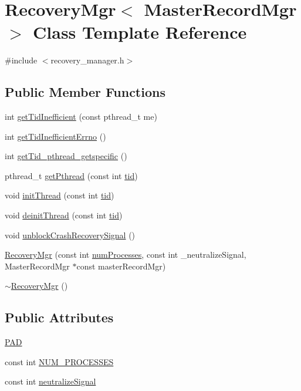 \hypertarget{classRecoveryMgr}{}\section{Recovery\+Mgr$<$ Master\+Record\+Mgr $>$ Class Template Reference}
\label{classRecoveryMgr}


{\ttfamily \#include $<$recovery\+\_\+manager.\+h$>$}

\subsection*{Public Member Functions}
\begin{DoxyCompactItemize}
\item 
int \hyperlink{classRecoveryMgr_a66bc99f5748e8418e9f111416d44dcac}{get\+Tid\+Inefficient} (const pthread\+\_\+t me)
\item 
int \hyperlink{classRecoveryMgr_a5917bf180cc6917ebb903a218d163aef}{get\+Tid\+Inefficient\+Errno} ()
\item 
int \hyperlink{classRecoveryMgr_a6c6f9170e844cb0a600b10ebf3ea6e37}{get\+Tid\+\_\+pthread\+\_\+getspecific} ()
\item 
pthread\+\_\+t \hyperlink{classRecoveryMgr_a9f8a5b27b63e5d1c51c31f7bdec75242}{get\+Pthread} (const int \hyperlink{microbench_2main_8cpp_a9ca9869868fe7e7a38a921cc7de4103f}{tid})
\item 
void \hyperlink{classRecoveryMgr_ad68f80af5f2371e66a39fed826f27c93}{init\+Thread} (const int \hyperlink{microbench_2main_8cpp_a9ca9869868fe7e7a38a921cc7de4103f}{tid})
\item 
void \hyperlink{classRecoveryMgr_a80eeb52e1d5658291f244ffe43b55b50}{deinit\+Thread} (const int \hyperlink{microbench_2main_8cpp_a9ca9869868fe7e7a38a921cc7de4103f}{tid})
\item 
void \hyperlink{classRecoveryMgr_a6158fad92d9250812d4a8f92a730aecd}{unblock\+Crash\+Recovery\+Signal} ()
\item 
\hyperlink{classRecoveryMgr_a303ad058a7752d20fdc5c437d6576e1a}{Recovery\+Mgr} (const int \hyperlink{testing_8cpp_aa085812188e21ede75351d88b9b2c30d}{num\+Processes}, const int \+\_\+neutralize\+Signal, Master\+Record\+Mgr $\ast$const master\+Record\+Mgr)
\item 
\hyperlink{classRecoveryMgr_a436371a5d4bfaafd37611e842cb10c9a}{$\sim$\+Recovery\+Mgr} ()
\end{DoxyCompactItemize}
\subsection*{Public Attributes}
\begin{DoxyCompactItemize}
\item 
\hyperlink{classRecoveryMgr_aa18a397143e99c8e72d175f3c9562c9e}{P\+AD}
\item 
const int \hyperlink{classRecoveryMgr_a3b3011e6a4a07820477038c246a0d801}{N\+U\+M\+\_\+\+P\+R\+O\+C\+E\+S\+S\+ES}
\item 
const int \hyperlink{classRecoveryMgr_a2447fa0d8ee553b79e9d9cc838162639}{neutralize\+Signal}
\end{DoxyCompactItemize}


